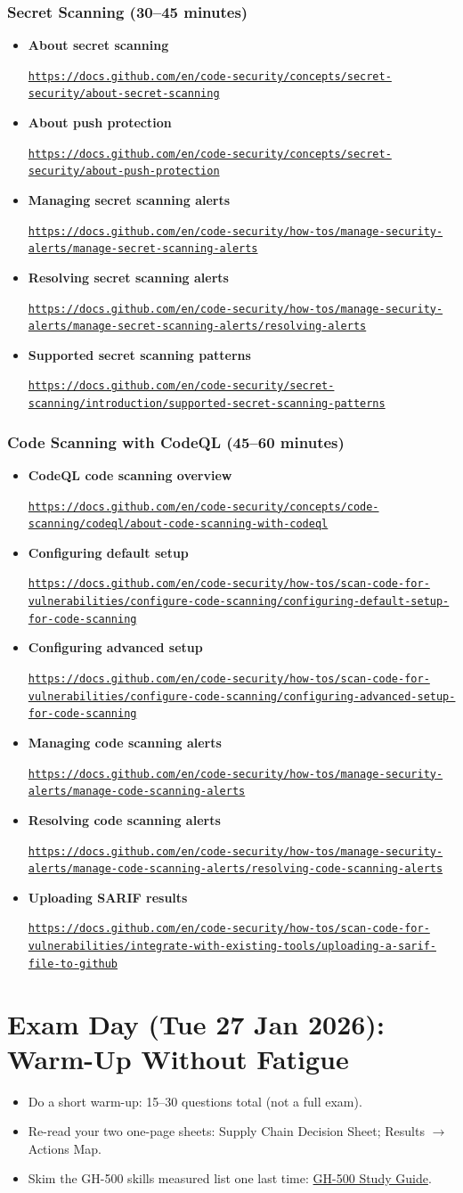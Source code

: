 \documentclass[11pt]{article}
\newcommand{\DocLink}[2]{%
  \item \textbf{#1}\par
  \noindent\href{#2}{\nolinkurl{#2}}%
}
\begin{document}
\subsubsection*{Secret Scanning (30--45 minutes)}
\begin{itemize}
  \DocLink{About secret scanning}{https://docs.github.com/en/code-security/concepts/secret-security/about-secret-scanning}
  \DocLink{About push protection}{https://docs.github.com/en/code-security/concepts/secret-security/about-push-protection}
  \DocLink{Managing secret scanning alerts}{https://docs.github.com/en/code-security/how-tos/manage-security-alerts/manage-secret-scanning-alerts}
  \DocLink{Resolving secret scanning alerts}{https://docs.github.com/en/code-security/how-tos/manage-security-alerts/manage-secret-scanning-alerts/resolving-alerts}
  \DocLink{Supported secret scanning patterns}{https://docs.github.com/en/code-security/secret-scanning/introduction/supported-secret-scanning-patterns}
\end{itemize}

\subsubsection*{Code Scanning with CodeQL (45--60 minutes)}
\begin{itemize}
  \DocLink{CodeQL code scanning overview}{https://docs.github.com/en/code-security/concepts/code-scanning/codeql/about-code-scanning-with-codeql}
  \DocLink{Configuring default setup}{https://docs.github.com/en/code-security/how-tos/scan-code-for-vulnerabilities/configure-code-scanning/configuring-default-setup-for-code-scanning}
  \DocLink{Configuring advanced setup}{https://docs.github.com/en/code-security/how-tos/scan-code-for-vulnerabilities/configure-code-scanning/configuring-advanced-setup-for-code-scanning}
  \DocLink{Managing code scanning alerts}{https://docs.github.com/en/code-security/how-tos/manage-security-alerts/manage-code-scanning-alerts}
  \DocLink{Resolving code scanning alerts}{https://docs.github.com/en/code-security/how-tos/manage-security-alerts/manage-code-scanning-alerts/resolving-code-scanning-alerts}
  \DocLink{Uploading SARIF results}{https://docs.github.com/en/code-security/how-tos/scan-code-for-vulnerabilities/integrate-with-existing-tools/uploading-a-sarif-file-to-github}
\end{itemize}

\clearpage
\section{Exam Day (Tue 27 Jan 2026): Warm-Up Without Fatigue}
\begin{itemize}
  \item Do a short warm-up: 15--30 questions total (not a full exam).
  \item Re-read your two one-page sheets: Supply Chain Decision Sheet; Results $\rightarrow$ Actions Map.
  \item Skim the GH-500 skills measured list one last time: \href{https://learn.microsoft.com/en-us/credentials/certifications/resources/study-guides/gh-500}{GH-500 Study Guide}.
\end{itemize}
\end{document}
